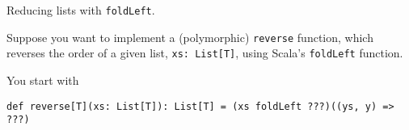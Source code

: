 \begin{questions}
\begin{comment}
\part What is the type of \texttt{y}?

\begin{checkboxes}
\choice \texttt{List[T]}
\choice \texttt{List[Int]}
\CorrectChoice \texttt{List[Any]}
\choice \texttt{List[Nothing]}
\choice \texttt{List(0, x, 4)} causes a run-time error.
\choice \texttt{List(0, x, 4)} causes a compile-time error.
\end{checkboxes}

\part What is \texttt{y.length}?

\begin{checkboxes}
\choice 0
\CorrectChoice 3
\choice 5
\choice \texttt{y.length} causes a run-time error.
\choice \texttt{y.length} causes a compile-time error.
\end{checkboxes}

\part What is \texttt{x == List(1, 2, y.length)}?

\begin{checkboxes}
\choice \texttt{List(1, 2, 3)}
\choice \texttt{List(x, 1, 2, 3)}
\CorrectChoice \texttt{true}
\choice \texttt{false}
\choice None of these.
\end{checkboxes}
\end{parts}
\end{comment}

\bigskip

\question[9] Reducing lists with \texttt{foldLeft}.

Suppose you want to implement a (polymorphic) \texttt{reverse} function, which reverses the order of a given list, \texttt{xs: List[T]}, using Scala's \texttt{foldLeft} function.

You start with

\begin{verbatim}
def reverse[T](xs: List[T]): List[T] = (xs foldLeft ???)((ys, y) => ???)
\end{verbatim}

\end{questions}
